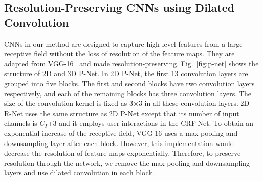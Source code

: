 \documentclass[10pt,journal,compsoc]{IEEEtran}
\begin{document}


	

\subsection{Resolution-Preserving CNNs using Dilated Convolution}\label{method:cnn_structures}
CNNs in our method are designed to capture high-level features from a large receptive field without the loss of resolution of the feature maps. They are adapted from VGG-16~\cite{Simonyan2015} and made resolution-preserving. Fig.~\ref{fig:p-net} shows the structure of 2D and 3D P-Net. In 2D P-Net, the first 13 convolution layers are grouped into five blocks. The first and second blocks have two convolution layers respectively, and each of the remaining blocks has three convolution layers. The size of the convolution kernel is fixed as 3$\times$3 in all these convolution layers.  2D R-Net uses the same structure as 2D P-Net except that its number of input channels is $C_I$+3 and it employs user interactions in the CRF-Net. To obtain an exponential increase of the receptive field, VGG-16 uses a max-pooling and downsampling layer after each block. However, this implementation would decrease the resolution of feature maps exponentially. Therefore, to preserve resolution through the network, we remove the max-pooling and downsampling layers and use dilated convolution in each block. 
\end{document}
